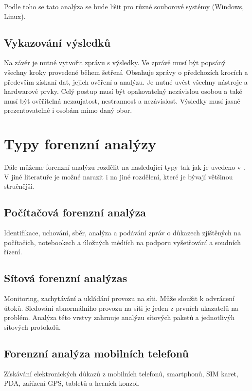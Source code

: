 \documentclass[thesis=B,czech]{FITthesis}[2012/06/26]
\begin{document}
\cite{for_root} Podle toho se tato analýza se bude lišit pro různé souborové systémy (Windows, Linux).

\subsection{Vykazování výsledků}
Na závěr je nutné vytvořit zprávu s výsledky. Ve zprávě musí být popsáný všechny kroky provedené během šetření. Obsahuje zprávy o předchozích krocích a především získaní dat, jejich ověření a analýzu. Je nutné uvést všechny nástroje a hardwarové prvky. Celý postup musí být opakovatelný nezávislou osobou a také musí být ověřitelná nezaujatost, nestrannost a nezávislost. Výsledky musí jasně prezentovatelné i osobám mimo daný obor.





\section{Typy forenzní analýzy}
Dále můžeme forenzní analýzu rozdělit na nasledující typy tak jak je uvedeno v \cite{for_types}. V jiné literatuře je možné narazit i na jiné rozdělení, které je bývají většinou stručnější.

\subsection{Počítačová forenzní analýza}
Identifikace, uchování, sběr, analýza a podávání zpráv o důkazech zjištěných na počítačích, notebookech a úložných médiích na podporu vyšetřování a soudních řízení.

\subsection{Sítová forenzní analýzas}
Monitoring, zachytávání a ukládání provozu na síti. Může sloužit k odvrácení útoků. Sledování abnormálního provozu na síti je jeden z prvních ukazatelů na problém. Analýza této vrstvy zahrnuje analýzu sítových paketů a jednotlivýh sítových protokolů\cite{carrier2003defining}.

\subsection{Forenzní analýza  mobilních telefonů}
Získávání elektronických důkazů z mobilních telefonů, smartphonů, SIM karet, PDA, zařízení GPS, tabletů a herních konzol.
\end{document}
